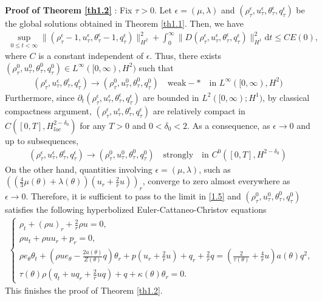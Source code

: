 \documentclass[11pt,reqno]{amsart}
\numberwithin{equation}{section}
\newcommand{\dif}{\mathrm{d}}
\begin{document}
{\bf Proof of Theorem \ref{th1.2}  }: Fix $\tau>0$. Let $\epsilon=(\mu, \lambda)$ and $(\rho_\tau^\epsilon, u_\tau^\epsilon, \theta_\tau^\epsilon, q_\tau^\epsilon)$ be the global solutions obtained in Theorem \ref{th1.1}.  Then, we have
\begin{align} \label{4.2}
\sup_{0\le t <\infty} \|(\rho_\tau^\epsilon-1, u_\tau^\epsilon, \theta_\tau^\epsilon-1, q_\tau^\epsilon)\|_{H^2}^2+\int_0^\infty \| D(\rho_\tau^\epsilon, u_\tau^\epsilon, \theta_\tau^\epsilon, q_\tau^\epsilon)\|_{H^1}^2 \dif t \le C E(0),
\end{align}
where $C$ is a constant independent of $\epsilon$.
Thus, there exists $(\rho_\tau^0, u_\tau^0, \theta_\tau^0, q_\tau^0)\in L^\infty([0, \infty), H^2)$ such that
\begin{align*}
(\rho_\tau^\epsilon, u_\tau^\epsilon, \theta_\tau^\epsilon, q_\tau^\epsilon) \rightarrow  (\rho_\tau^0, u_\tau^0, \theta_\tau^0, q_\tau^0) \quad \text{weak}-\ast \quad \mbox{in } L^\infty([0, \infty), H^2)
\end{align*}
Furthermore, since $ \partial_t ( \rho_\tau^\epsilon, u_\tau^\epsilon, \theta_\tau^\epsilon, q_\tau^\epsilon) $ are bounded in $L^2([0,\infty); H^1)$, by classical compactness argument, $(\rho_\tau^\epsilon, u_\tau^\epsilon, \theta_\tau^\epsilon, q_\tau^\epsilon)$ are relatively compact in $C([0, T], H_{loc}^{2-\delta_0})$ for any $T>0$ and $0<\delta_0<2$. As a consequence, as $\epsilon \rightarrow 0$ and up to subsequences,
\begin{align*}
(\rho_\tau^\epsilon, u_\tau^\epsilon, \theta_\tau^\epsilon, q_\tau^\epsilon) \rightarrow  (\rho_\tau^0, u_\tau^0, \theta_\tau^0, q_\tau^0) \quad \text{strongly} \quad \mbox{in } C^0([0, T], H^{2-\delta_0})
\end{align*}
On the other hand, quantities involving $\epsilon=(\mu, \lambda)$, such as $\left( \left( \frac{4}{3} \mu(\theta) + \lambda(\theta) \right) \left( u_r + \frac{2}{r} u \right) \right)_r$, converge to zero almost everywhere as $\epsilon \to 0$. Therefore, it is sufficient to pass  to the limit in \eqref{1.5} and $(\rho_\tau^0, u_\tau^0, \theta_\tau^0, q_\tau^0)$ satisfies the following hyperbolized Euler-Cattaneo-Christov equations
\begin{align}\label{4.3}
\begin{cases}
	\rho_t+(\rho u)_r+\frac{2}{r} \rho u = 0, \\
	\rho u_t+\rho u u_r+ p_r = 0,\\
	\rho e_\theta \theta_t + (\rho u e_\theta - \frac{2a(\theta)}{Z(\theta)} q)\theta_r + p\left(u_r+\frac{2}{r} u\right) + q_r + \frac{2}{r} q =
	 \left(\frac{2}{\tau(\theta)}+\frac{4}{r} u\right) a(\theta) q^2,  \\
	\tau (\theta) \rho \left(q_t+u q_r+\frac{2}{r} u q\right) + q + \kappa(\theta) \theta_r = 0.
\end{cases}
\end{align}
This finishes the proof of Theorem \ref{th1.2}.
\end{document}

